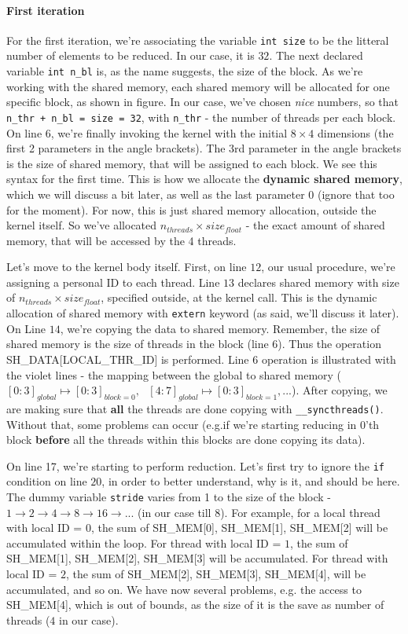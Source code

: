 \documentclass[12pt]{article}
\begin{document}
\paragraph*{First iteration}
For the first iteration, we're associating the variable \verb|int size| to be the litteral 
number of elements to be reduced. In our case, it is $32$. The next declared variable \verb|int n_bl| is, 
as the name suggests, the size of the block. As we're working with the shared memory, each shared memory 
will be allocated for one specific block, as shown in figure. In our case, we've chosen \textit{nice} 
numbers, so that \verb|n_thr + n_bl = size = 32|, with \verb|n_thr| - the number of threads per each block.
On line $6$, we're finally invoking the kernel with the initial $8\times 4$ dimensions (the first 2 parameters in the angle brackets). 
The 3rd parameter in the angle brackets is the size of shared memory, that will be assigned to each block. 
We see this syntax for the first time. This is how we allocate the \textbf{dynamic shared memory}, which we will 
discuss a bit later, as well as the last parameter $0$ (ignore that too for the moment).
For now, this is just shared memory allocation, outside the kernel itself. So we've allocated 
$n_{threads}\times size_{float}$ - the exact amount of shared memory, that will be accessed by the 4 threads. 

Let's move to the kernel body itself. First, on line $12$, our usual procedure, we're assigning a personal 
ID to each thread. Line $13$ declares shared memory with size of $n_{threads}\times size_{float}$, specified outside, 
at the kernel call. This is the dynamic allocation of shared memory with \verb|extern| keyword 
(as said, we'll discuss it later). On Line $14$, we're copying the data to shared memory. Remember, 
the size of shared memory is the size of threads in the block (line $6$). Thus the operation 
SH\_DATA[LOCAL\_THR\_ID] is performed. Line $6$ operation is illustrated with the violet lines - the
mapping between the global to shared memory ($[0:3]_{global}\mapsto [0:3]_{block=0},\text{ } [4:7]_{global}\mapsto [0:3]_{block=1}, \text{...} $).
After copying, we are making sure that \textbf{all} the threads are done copying with \verb|__syncthreads()|. Without that, some problems can occur 
(e.g.if we're starting reducing in 0'th block \textbf{before} all the threads within this blocks are done copying its data).

On line 17, we're starting to perform reduction. Let's first try to ignore the \verb|if| 
condition on line $20$, in order to better understand, why is it, and should be here. The 
dummy variable \verb|stride| varies from 1 to the size of the block -
$1\to 2\to 4\to 8\to 16 \to ...$ (in our case till $8$).%
For example, for a local thread with local ID = $0$, the sum of SH\_MEM[0], SH\_MEM[1], SH\_MEM[2] will be accumulated 
within the loop. For thread with local ID = $1$, the sum of SH\_MEM[1], SH\_MEM[2], SH\_MEM[3] will be accumulated. For
thread with local ID = $2$, the sum of SH\_MEM[2], SH\_MEM[3], SH\_MEM[4], will be accumulated, and so on. 
We have now several problems, e.g. the access to SH\_MEM[4], which is out of bounds, as the size of it is the 
save as number of threads ($4$ in our case). 
\end{document}
